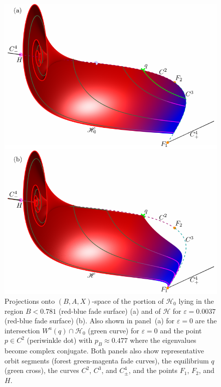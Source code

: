 \documentclass{ws-ijbc}
\begin{document}
\begin{figure}[t!]
\centering
\includegraphics[]{./figures/MKMO_13.pdf}
\caption{Projections onto $(B,A,X)$-space of the portion of $\mathscr{H}_0$ lying in the region $B < 0.781$ (red-blue fade surface) (a) and of $\mathscr{H}$ for $\varepsilon=0.0037$ (red-blue fade surface) (b).   Also shown in panel~(a) for $\varepsilon=0$ are the intersection $W^u(q)\cap\mathscr{H}_0$ (green curve) for $\varepsilon=0$ and the point $p \in C^2$ (periwinkle dot) with $p_B \approx 0.477$ where the eigenvalues become complex conjugate.   Both panels also show representative orbit segments (forest green-magenta fade curves), the equilibrium $q$ (green cross), the curves $C^2$, $C^3$, and $C^4_\pm$, and the points $F_1$, $F_2$, and $H$.}
\label{figure_13}
\end{figure}
\end{document}
